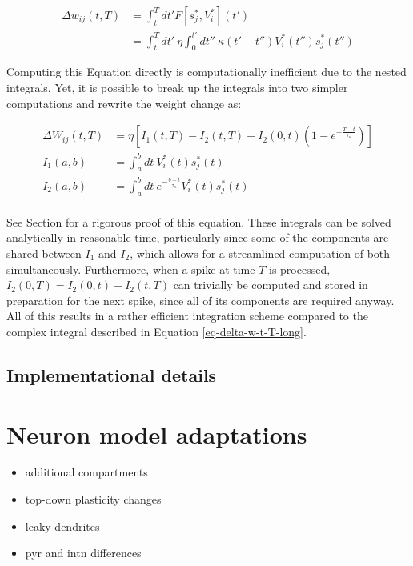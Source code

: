 \begin{align}
  \Delta w_{ij}(t,T) & = \int_t^T dt' F[s_j^\ast, V_i^\ast](t')                                                                           \\
                     & =  \int_t^T dt' \  \eta\int_0^{t'} dt'' \ \kappa(t'-t'') V_i^\ast (t'') s_j^\ast (t'') \label{eq-delta-w-t-T-long}
\end{align}

Computing this Equation directly is computationally inefficient due to the nested integrals. Yet, it is possible to
break up the integrals into two simpler computations and rewrite the weight change as:


\begin{align}
  \Delta W_{ij}(t, T) & = \eta \left[ I_1 (t, T) - I_2(t,T) + I_2(0,t)\left( 1- e^{-\frac{T-t}{\tau_\kappa}} \right) \right] \\
  I_1(a, b)           & = \int_{a}^{b} dt \ V_i^\ast (t) s_j^\ast (t)                                                        \\
  I_2(a, b)           & = \int_{a}^{b} dt \ e^{-\frac{b-t}{\tau_\kappa}} V_i^\ast (t) s_j^\ast (t)                           \\
\end{align}

See Section  for a rigorous proof of this equation. These integrals can be solved analytically in reasonable
time, particularly since some of the components are shared between $I_1$ and $I_2$, which allows for a streamlined
computation of both simultaneously. Furthermore, when a spike at time $T$ is processed, $I_2(0,T) = I_2(0,t) + I_2(t,
  T)$ can trivially be computed and stored in preparation for the next spike, since all of its components are required
anyway. All of this results in a rather efficient integration scheme compared to the complex integral described in
Equation \ref{eq-delta-w-t-T-long}.

\subsection{Implementational details}



\section{Neuron model adaptations}

\begin{itemize}
  \item additional compartments
  \item top-down plasticity changes
  \item leaky dendrites
  \item pyr and intn differences
\end{itemize}

